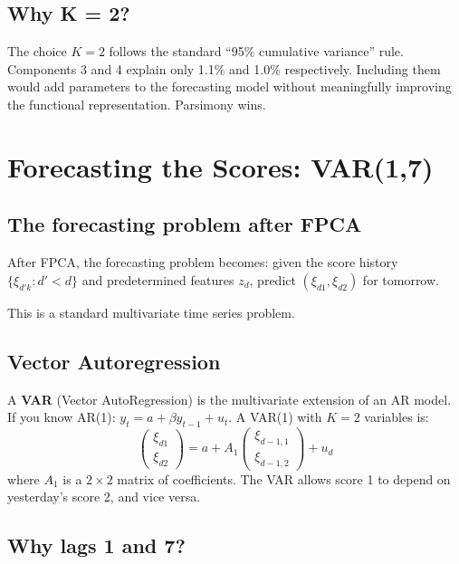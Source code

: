 \documentclass[11pt,a4paper]{article}
\begin{document}
\subsection{Why K = 2?}

The choice $K=2$ follows the standard ``95\% cumulative variance'' rule.
Components 3 and 4 explain only 1.1\% and 1.0\% respectively. Including
them would add parameters to the forecasting model without meaningfully
improving the functional representation. Parsimony wins.

\section{Forecasting the Scores: VAR(1,7)}

\subsection{The forecasting problem after FPCA}

After FPCA, the forecasting problem becomes: given the score history
$\{\xi_{d'k} : d' < d\}$ and predetermined features $z_d$, predict
$(\xi_{d1}, \xi_{d2})$ for tomorrow.

This is a standard multivariate time series problem.

\subsection{Vector Autoregression}

A \textbf{VAR} (Vector AutoRegression) is the multivariate extension of
an AR model. If you know AR(1): $y_t = a + \beta y_{t-1} + u_t$.
A VAR(1) with $K=2$ variables is:
\[
\begin{pmatrix} \xi_{d1} \\ \xi_{d2} \end{pmatrix}
= a + A_1 \begin{pmatrix} \xi_{d-1,1} \\ \xi_{d-1,2} \end{pmatrix} + u_d
\]
where $A_1$ is a $2 \times 2$ matrix of coefficients. The VAR allows
score 1 to depend on yesterday's score 2, and vice versa.

\subsection{Why lags 1 and 7?}
\end{document}
